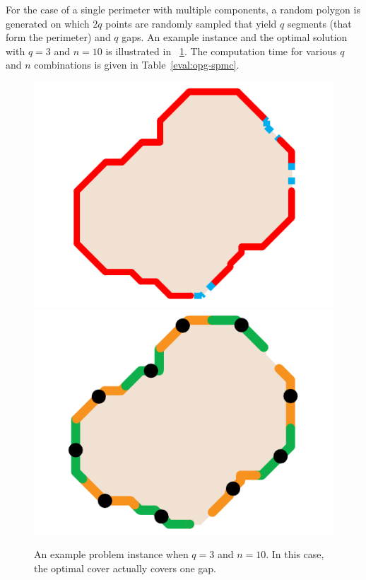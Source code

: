 For the case of a single perimeter with multiple components, a random 
polygon is generated on which $2q$ points are randomly sampled that 
yield $q$ segments (that form the perimeter) and $q$ gaps. An example 
instance and the optimal solution with $q=3$ and $n = 10$ is illustrated 
in ~\ref{fig:opg-spmc-example}. The computation time for various $q$ and 
$n$ combinations is given in Table~\ref{eval:opg-spmc}.
\begin{figure}[ht!]
    \centering
    \includegraphics[keepaspectratio, scale=0.4]{./chapters/opg/figures/spmc-example-eps-converted-to.pdf}
    \includegraphics[keepaspectratio, scale=0.4]{./chapters/opg/figures/spmc-solution-eps-converted-to.pdf}
    \caption[Example OPG problem instance of SPMC]{\label{fig:opg-spmc-example} 
    An example problem instance when $q = 3$ and $n = 10$. In this case, the 
		optimal cover actually covers one gap.}
\end{figure}

